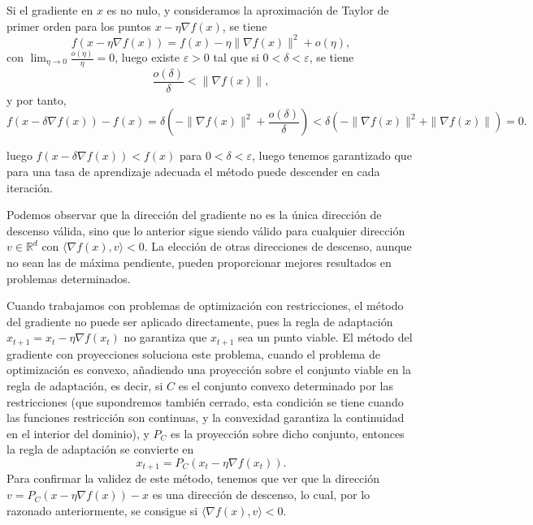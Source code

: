 \vspace{0.3cm}

Si el gradiente en $x$ es no nulo, y consideramos la aproximación de Taylor de primer orden para los puntos $x - \eta \nabla f(x)$, se tiene
\[
f(x - \eta \nabla f(x)) = f(x) - \eta \|\nabla f(x)\|^2 + o(\eta),
\]
con $\lim_{\eta \to 0} \frac{o(\eta)}{\eta} = 0$, luego existe $\varepsilon > 0$ tal que si $0 < \delta < \varepsilon$, se tiene
\[
\frac{o(\delta)}{\delta} < \|\nabla f(x)\|,
\]
y por tanto,
\[
f(x - \delta \nabla f(x)) - f(x) = \delta \left( -\|\nabla f(x)\|^2 + \frac{o(\delta)}{\delta} \right) < \delta \left( -\|\nabla f(x)\|^2 + \|\nabla f(x)\| \right) = 0.
\]

luego $f(x - \delta \nabla f(x)) < f(x)$ para $0 < \delta < \varepsilon$, luego tenemos garantizado que para una tasa de aprendizaje adecuada el método puede descender en cada iteración. 

Podemos observar que la dirección del gradiente no es la única dirección de descenso válida, sino que lo anterior sigue siendo válido para cualquier dirección $v \in \mathbb{R}^d$ con $\langle \nabla f(x), v \rangle < 0$. La elección de otras direcciones de descenso, aunque no sean las de máxima pendiente, pueden proporcionar mejores resultados en problemas determinados.

\vspace{0.3cm}

Cuando trabajamos con problemas de optimización con restricciones, el método del gradiente no puede ser aplicado directamente, pues la regla de adaptación $x_{t+1} = x_t - \eta \nabla f(x_t)$ no garantiza que $x_{t+1}$ sea un punto viable. El método del gradiente con proyecciones soluciona este problema, cuando el problema de optimización es convexo, añadiendo una proyección sobre el conjunto viable en la regla de adaptación, es decir, si $C$ es el conjunto convexo determinado por las restricciones (que supondremos también cerrado, esta condición se tiene cuando las funciones restricción son continuas, y la convexidad garantiza la continuidad en el interior del dominio), y $P_C$ es la proyección sobre dicho conjunto, entonces la regla de adaptación se convierte en
\[
x_{t+1} = P_C(x_t - \eta \nabla f(x_t)).
\]
Para confirmar la validez de este método, tenemos que ver que la dirección $v = P_C(x - \eta \nabla f(x)) - x$ es una dirección de descenso, lo cual, por lo razonado anteriormente, se consigue si $\langle \nabla f(x), v \rangle < 0$.

\vspace{0.3cm}

